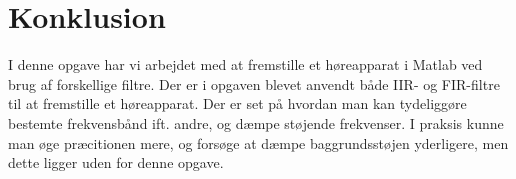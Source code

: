\chapter{Konklusion}\label{ch:konclusion}
I denne opgave har vi arbejdet med at fremstille et høreapparat i Matlab ved brug af forskellige filtre. Der er i opgaven blevet anvendt både IIR- og FIR-filtre til at fremstille et høreapparat. Der er set på hvordan man kan tydeliggøre bestemte frekvensbånd ift. andre, og dæmpe støjende frekvenser. I praksis kunne man øge præcitionen mere, og forsøge at dæmpe baggrundsstøjen yderligere, men dette ligger uden for denne opgave.  
